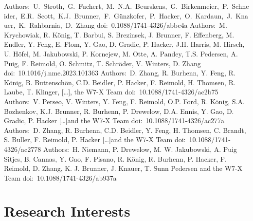 \documentclass[11pt,a4paper]{moderncv}
\begin{document}
        {Authors:~U.~Stroth,~G.~Fuchert,~M.~N.A.~Beurskens,~G.~Birkenmeier,~P.~Schneider,~E.R.~Scott,~K.J.~Brunner,~F.~Günzkofer,~P.~Hacker,~O.~Kardaun,~J.~Knauer,~K.~Rahbarnia,~D.~Zhang}{%
        doi:~0.1088/1741-4326/abbc4a}{}{}
        {Authors:~M. Krychowiak, R. König, T. Barbui, S. Brezinsek, J. Brunner, F. Effenberg, M. Endler, Y. Feng, E. Flom, Y. Gao, D. Gradic, P. Hacker, J.H. Harris, M. Hirsch, U. Höfel, M. Jakubowski, P. Kornejew, M. Otte, A. Pandey, T.S. Pedersen, A. Puig, F. Reimold, O. Schmitz, T. Schröder, V. Winters, D. Zhang}{%
        doi:~10.1016/j.nme.2023.101363}{}{}%
        {Authors:~D. Zhang, R. Burhenn, Y. Feng, R. König, B. Buttenschön, C.D. Beidler, P. Hacker, F. Reimold, H. Thomsen, R. Laube, T. Klinger, [\dots],  the W7-X Team}{%
        doi:~10.1088/1741-4326/ac2b75}{}{}%
        {Authors:~V. Perseo, V. Winters, Y. Feng, F. Reimold, O.P. Ford, R. König, S.A. Bozhenkov, K.J. Brunner, R. Burhenn, P. Drewelow, D.A. Ennis, Y. Gao, D. Gradic, P. Hacker [\dots]and the W7-X Team}{%
        doi:~10.1088/1741-4326/ac277a}{}{}%
        {Authors:~D. Zhang, R. Burhenn, C.D. Beidler, Y. Feng, H. Thomsen, C. Brandt, S. Buller, F. Reimold, P. Hacker [\dots]and the W7-X Team}{%
        doi:~10.1088/1741-4326/ac2778}{}{}%
        {Authors:~H. Niemann, P. Drewelow, M. W. Jakubowski, A. Puig Sitjes, B. Cannas, Y. Gao, F. Pisano, R. König, R. Burhenn, P. Hacker, F. Reimold, D. Zhang, K. J. Brunner, J. Knauer, T. Sunn Pedersen and the W7-X Team}{%
        doi:~10.1088/1741-4326/ab937a}{}{}%


    \section{Research Interests}
\end{document}
